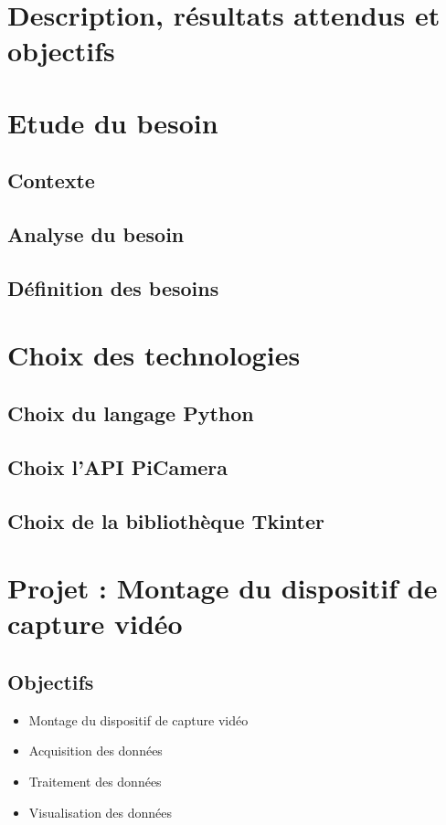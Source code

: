     \section{Description, résultats attendus et objectifs}
    \section{Etude du besoin}
        \subsection{Contexte}
        \subsection{Analyse du besoin}
        \subsection{Définition des besoins}
        
    \section{Choix des technologies}
        \subsection{Choix du langage Python}
        \subsection{Choix l'API PiCamera}
        \subsection{Choix de la bibliothèque Tkinter}
        \section{Projet : Montage du dispositif de capture vidéo}
      
        \subsection{Objectifs}
            \begin{itemize}
                \item Montage du dispositif de capture vidéo
                \item Acquisition des données
                \item Traitement des données
                \item Visualisation des données
            \end{itemize}
    

